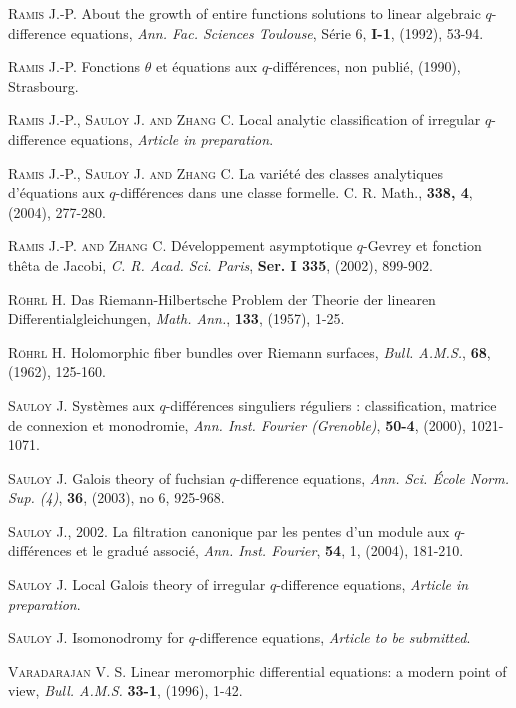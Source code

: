 \documentclass[english]{smfart}
\numberwithin{equation}{thm}
\begin{document}
\begin{thebibliography}{}
 \textsc{Ramis J.-P.}
About the growth of entire functions solutions to linear algebraic
$q$-difference equations,
\emph{Ann.  Fac.  Sciences Toulouse}, S\'erie 6, {\bf
I-1}, (1992), 53-94.

 \textsc{Ramis J.-P.}
Fonctions $\theta$ et \'equations aux $q$-diff\'erences,
non publi\'e, (1990), Strasbourg.

 \textsc{Ramis J.-P., Sauloy J. and Zhang C.}
Local analytic classification of  irregular $q$-difference
equations, \emph{Article in preparation}.

 \textsc{Ramis J.-P., Sauloy J. and Zhang C.}
La vari\'et\'e des classes analytiques d'\'equations aux
$q$-diff\'erences dans une classe formelle.
C. R. Math., {\bf 338, 4}, (2004), 277-280.

 \textsc{Ramis J.-P. and Zhang C.}
D\'eveloppement asymptotique $q$-Gevrey et
fonction th\^eta de Jacobi,
\emph{C. R. Acad. Sci. Paris}, {\bf Ser. I 335}, (2002), 899-902.

 \textsc{R\"{o}hrl H.}
Das Riemann-Hilbertsche Problem der Theorie der linearen
Differentialgleichungen,
\emph{Math. Ann.}, {\bf 133}, (1957), 1-25.

 \textsc{R\"{o}hrl H.}
Holomorphic fiber bundles over Riemann surfaces,
\emph{Bull. A.M.S.}, {\bf 68}, (1962), 125-160.

 \textsc{Sauloy J.}
Syst\`emes aux $q$-diff\'erences singuliers r\'eguliers :
classification, matrice de connexion et monodromie,
\emph{Ann. Inst. Fourier (Grenoble)},
{\bf 50-4}, (2000), 1021-1071.

 \textsc{Sauloy J.}
Galois theory of fuchsian $q$-difference equations,
\emph{Ann. Sci. \'Ecole Norm. Sup. (4)}, {\bf 36}, (2003), no 6, 925-968.

 \textsc{Sauloy J., 2002.}
La filtration canonique par les pentes d'un module aux $q$-diff\'erences
et le gradu\'e associ\'e,
\emph{Ann. Inst. Fourier}, {\bf 54}, 1, (2004), 181-210.

 \textsc{Sauloy J.}
Local Galois theory of irregular $q$-difference equations,
\emph{Article in preparation}.

 \textsc{Sauloy J.}
Isomonodromy for $q$-difference equations,
\emph{Article to be submitted}.

 \textsc{Varadarajan V. S.}
Linear meromorphic differential equations: a modern point of view,
\emph{Bull. A.M.S.} {\bf 33-1}, (1996), 1-42.


\end{thebibliography}
\end{document}
